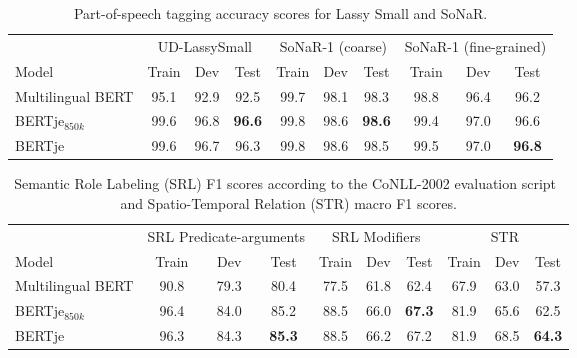 \documentclass[11pt]{article}
\begin{document}
\begin{table}[t]
\begin{center}
  \begin{tabular}{l || c c c | c c c | c c c}
    \toprule
                   & \multicolumn{3}{c|}{UD-LassySmall} & \multicolumn{3}{c|}{SoNaR-1 (coarse)}    & \multicolumn{3}{c}{SoNaR-1 (fine-grained)}                                                \\
    Model          & Train   & Dev  & Test  & Train & Dev  & Test &                          Train & Dev  & Test              \\
    \midrule
    Multilingual BERT & 95.1 & 92.9 & 92.5                 & 99.7  & 98.1 & 98.3             & 98.8 & 96.4 & 96.2      \\
BERTje$_{850k}$   & 99.6 & 96.8 & \textbf{96.6}        & 99.8  & 98.6 & \textbf{98.6}    & 99.4 & 97.0 & 96.6 \\
    BERTje            & 99.6 & 96.7 & 96.3                 & 99.8  & 98.6 & 98.5             & 99.5 & 97.0 & \textbf{96.8} \\
    \bottomrule
  \end{tabular}
   \caption{\label{table:pos} Part-of-speech tagging accuracy scores for Lassy Small and SoNaR.}
\end{center}
\end{table}


\begin{table}[H]
\begin{center}
  \begin{tabular}{l || c c c | c c c | c c c}
    \toprule
                   & \multicolumn{3}{c|}{SRL Predicate-arguments} & \multicolumn{3}{c|}{SRL Modifiers} & \multicolumn{3}{c}{STR}                                                   \\
    Model             & Train & Dev & Test           & Train & Dev & Test           & Train & Dev   & Test \\
    \midrule
    Multilingual BERT & 90.8 & 79.3 & 80.4           & 77.5 & 61.8 & 62.4           & 67.9 & 63.0 & 57.3 \\
    BERTje$_{850k}$   & 96.4 & 84.0 & 85.2           & 88.5 & 66.0 & \textbf{67.3}  & 81.9 & 65.6 & 62.5 \\
    BERTje            & 96.3 & 84.3 & \textbf{85.3}  & 88.5 & 66.2 & 67.2           & 81.9 & 68.5 & \textbf{64.3} \\
    \bottomrule
  \end{tabular}
   \caption{\label{table:srl}Semantic Role Labeling (SRL) F1 scores according to the CoNLL-2002 evaluation script~\citep{tjong2002conll} and Spatio-Temporal Relation (STR) macro F1 scores.}
\end{center}
\end{table}
\end{document}
